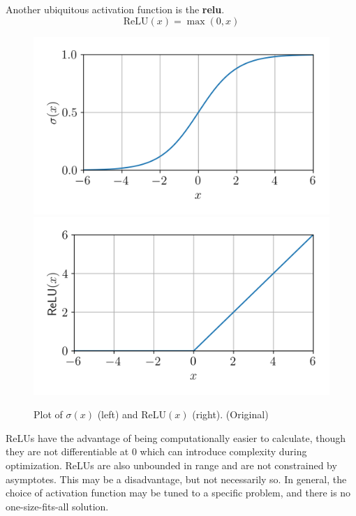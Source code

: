 \documentclass[12pt]{report}
\theoremstyle{definition}
\theoremstyle{remark}
\begin{document}
Another ubiquitous activation function is the \textbf{\gls{relu}}.
\begin{equation}
    \text{ReLU}(x) = \max(0,x)
\end{equation}
\begin{figure}[h]
    \centering
    \includegraphics[width=0.45\linewidth]{figs/sigmoid.png}
    \includegraphics[width=0.45\linewidth]{figs/relu.png}
    \caption{Plot of $\sigma(x)$ (left) and $\text{ReLU}(x)$ (right). (Original)}
    \label{fig:enter-label}
\end{figure}

ReLUs have the advantage of being computationally easier to calculate, though they are not differentiable at $0$ which can introduce complexity during optimization. ReLUs are also unbounded in range and are not constrained by asymptotes. This may be a disadvantage, but not necessarily so. In general, the choice of activation function may be tuned to a specific problem, and there is no one-size-fits-all solution.
\end{document}
